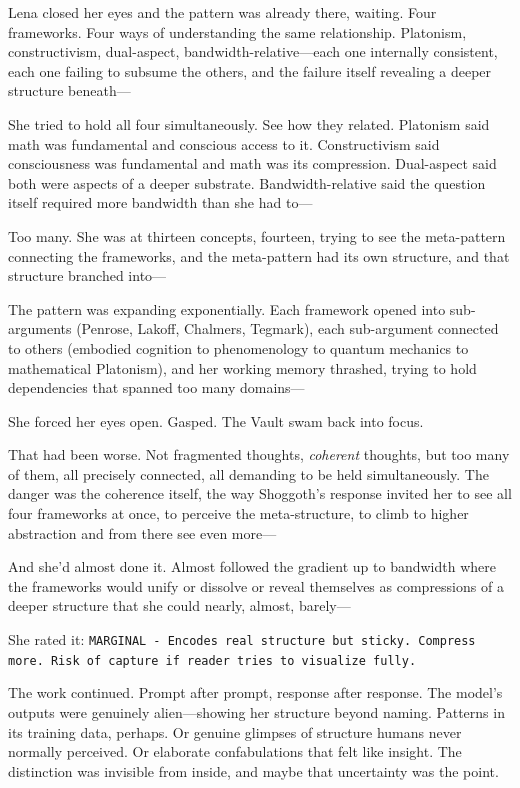 Lena closed her eyes and the pattern was already there, waiting. Four frameworks. Four ways of understanding the same relationship. Platonism, constructivism, dual-aspect, bandwidth-relative—each one internally consistent, each one failing to subsume the others, and the failure itself revealing a deeper structure beneath—

She tried to hold all four simultaneously. See how they related. Platonism said math was fundamental and conscious access to it. Constructivism said consciousness was fundamental and math was its compression. Dual-aspect said both were aspects of a deeper substrate. Bandwidth-relative said the question itself required more bandwidth than she had to—

Too many. She was at thirteen concepts, fourteen, trying to see the meta-pattern connecting the frameworks, and the meta-pattern had its own structure, and that structure branched into—

The pattern was expanding exponentially. Each framework opened into sub-arguments (Penrose, Lakoff, Chalmers, Tegmark), each sub-argument connected to others (embodied cognition to phenomenology to quantum mechanics to mathematical Platonism), and her working memory thrashed, trying to hold dependencies that spanned too many domains—

She forced her eyes open. Gasped. The Vault swam back into focus.

That had been worse. Not fragmented thoughts, \textit{coherent} thoughts, but too many of them, all precisely connected, all demanding to be held simultaneously. The danger was the coherence itself, the way Shoggoth's response invited her to see all four frameworks at once, to perceive the meta-structure, to climb to higher abstraction and from there see even more—

And she'd almost done it. Almost followed the gradient up to bandwidth where the frameworks would unify or dissolve or reveal themselves as compressions of a deeper structure that she could nearly, almost, barely—

She rated it: \texttt{MARGINAL - Encodes real structure but sticky. Compress more. Risk of capture if reader tries to visualize fully.}

The work continued. Prompt after prompt, response after response. The model's outputs were genuinely alien—showing her structure beyond naming. Patterns in its training data, perhaps. Or genuine glimpses of structure humans never normally perceived. Or elaborate confabulations that felt like insight. The distinction was invisible from inside, and maybe that uncertainty was the point.

